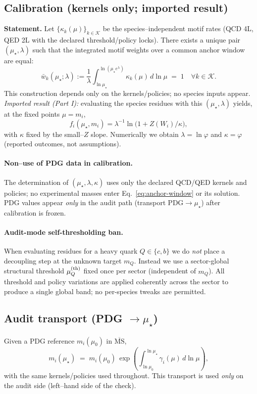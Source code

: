 \documentclass[epjc3]{svjour3}
\begin{document}
\subsection*{Calibration (kernels only; imported result)}
\label{sec:calibration}
\noindent\textbf{Statement.}
Let $\{\kappa_k(\mu)\}_{k\in\mathcal K}$ be the species–independent motif rates
(QCD 4L, QED 2L with the declared threshold/policy locks). There exists a unique
pair $(\mu_\star,\lambda)$ such that the integrated motif weights over a common
anchor window are equal:
\begin{equation}
  \bar w_k(\mu_\star;\lambda)
  := \frac{1}{\lambda}\int_{\ln\mu_\star}^{\ln(\mu_\star e^\lambda)}\!\!\kappa_k(\mu)\,d\ln\mu
  \;=\;1\quad\forall k\in\mathcal K.
  \label{eq:anchor-window}
\end{equation}
This construction depends only on the kernels/policies; no species inputs appear.
\emph{Imported result (Part I):} evaluating the species residues with this $(\mu_\star,\lambda)$ yields, at the fixed points $\mu=m_i$,
\[
  f_i(\mu_\star,m_i)=\lambda^{-1}\ln\!\bigl(1+Z(W_i)/\kappa\bigr),
\]
with $\kappa$ fixed by the small–$Z$ slope. Numerically we obtain $\lambda=\ln\varphi$ and $\kappa=\varphi$ (reported outcomes, not assumptions).

\paragraph{Non–use of PDG data in calibration.}
The determination of $(\mu_\star,\lambda,\kappa)$ uses only the declared QCD/QED kernels and policies; no experimental masses enter Eq.~\eqref{eq:anchor-window} or its solution. PDG values appear \emph{only} in the audit path (transport PDG$\to\mu_\star$) after calibration is frozen.

\paragraph{Audit-mode self-thresholding ban.}
When evaluating residues for a heavy quark $Q\in\{c,b\}$ we do \emph{not}
place a decoupling step at the unknown target $m_Q$.
Instead we use a sector-global structural threshold $\mu_Q^{\rm(th)}$
fixed once per sector (independent of $m_Q$).
All threshold and policy variations are applied coherently across the sector to produce a single global band; no per-species tweaks are permitted.

\subsection*{Audit transport (PDG $\to \mu_\star$)}
Given a PDG reference $m_i(\mu_0)$ in $\overline{\mathrm{MS}}$,
\begin{equation}
  m_i(\mu_\star)\;=\;m_i(\mu_0)\,
  \exp\!\left(\int_{\ln\mu_0}^{\ln\mu_\star}\gamma_i(\mu)\,d\ln\mu\right),
  \label{eq:PDG-to-mu-star}
\end{equation}
with the same kernels/policies used throughout. This transport is used \emph{only} on the audit side (left–hand side of the check).
\end{document}
